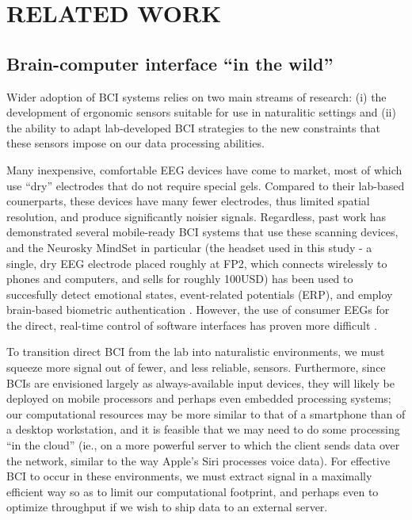 \section{\uppercase{Related Work}}
\subsection{Brain-computer interface ``in the wild''}

\noindent Wider adoption of BCI systems relies on two main streams of research: (i) the development of ergonomic sensors suitable for use in naturalitic settings and (ii) the ability to adapt lab-developed BCI strategies to the new constraints that these sensors impose on our data processing abilities. 

Many inexpensive, comfortable EEG devices have come to market, most of which use ``dry'' electrodes that do not require special gels. Compared to their lab-based counerparts, these devices have many fewer electrodes, thus limited spatial resolution, and produce significantly noisier signals. Regardless, past work has demonstrated several mobile-ready BCI systems that use these scanning devices, and the Neurosky MindSet in particular (the headset used in this study - a single, dry EEG electrode placed roughly at FP2, which connects wirelessly to phones and computers, and sells for roughly 100USD) has been used to succesfully detect emotional states, event-related potentials (ERP), and employ brain-based biometric authentication \cite{crowley_evaluating_2010,grierson_better_2011,adams_i_2013}.  However, the use of consumer EEGs for the direct, real-time control of software interfaces has proven more difficult \cite{carrino_self-paced_2012,larsen_classification_2011}. 

To transition direct BCI from the lab into naturalistic environments, we must squeeze more signal out of fewer, and less reliable, sensors. Furthermore, since BCIs are envisioned largely as always-available input devices, they will likely be deployed on mobile processors and perhaps even embedded processing systems; our computational resources may be more similar to that of a smartphone than of a desktop workstation, and it is feasible that we may need to do some processing ``in the cloud'' (ie., on a more powerful server to which the client sends data over the network, similar to the way Apple's Siri processes voice data). For effective BCI to occur in these environments, we must extract signal in a maximally efficient way so as to limit our computational footprint, and perhaps even to optimize throughput if we wish to ship data to an external server.

